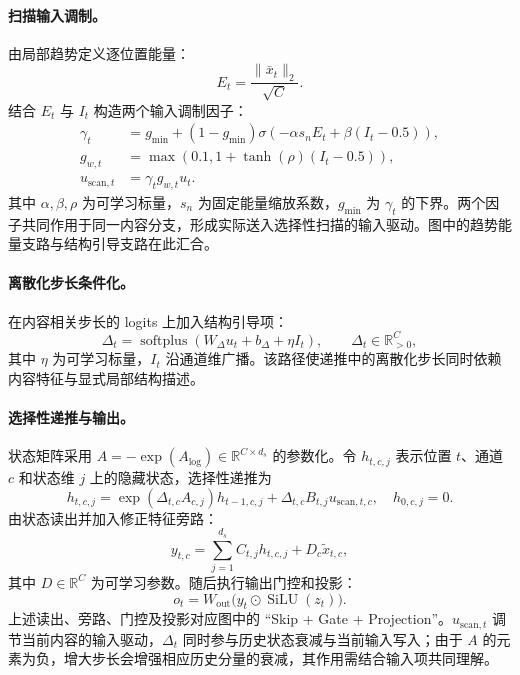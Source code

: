 \documentclass[UTF8,12pt,a4paper]{ctexart}
\begin{document}
\paragraph{扫描输入调制。}
由局部趋势定义逐位置能量：
\begin{equation}
E_t=\frac{\|\bar{x}_t\|_2}{\sqrt{C}}.
\label{eq:trend_energy}
\end{equation}
结合 $E_t$ 与 $I_t$ 构造两个输入调制因子：
\begin{align}
\gamma_t&=g_{\min}+(1-g_{\min})\sigma\!\left(-\alpha s_nE_t+\beta(I_t-0.5)\right),\\
g_{w,t}&=\max\!\left(0.1,1+\tanh(\rho)(I_t-0.5)\right),\\
u_{\mathrm{scan},t}&=\gamma_tg_{w,t}u_t.
\label{eq:modulation}
\end{align}
其中 $\alpha,\beta,\rho$ 为可学习标量，$s_n$ 为固定能量缩放系数，$g_{\min}$ 为 $\gamma_t$ 的下界。两个因子共同作用于同一内容分支，形成实际送入选择性扫描的输入驱动。图中的趋势能量支路与结构引导支路在此汇合。

\paragraph{离散化步长条件化。}
在内容相关步长的 logits 上加入结构引导项：
\begin{equation}
\Delta_t=\operatorname{softplus}\!\left(W_{\Delta}u_t+b_{\Delta}+\eta I_t\right),
\qquad\Delta_t\in\mathbb{R}_{>0}^{C},
\label{eq:delta_condition}
\end{equation}
其中 $\eta$ 为可学习标量，$I_t$ 沿通道维广播。该路径使递推中的离散化步长同时依赖内容特征与显式局部结构描述。

\paragraph{选择性递推与输出。}
状态矩阵采用 $A=-\exp(A_{\log})\in\mathbb{R}^{C\times d_s}$ 的参数化。令 $h_{t,c,j}$ 表示位置 $t$、通道 $c$ 和状态维 $j$ 上的隐藏状态，选择性递推为
\begin{equation}
h_{t,c,j}=\exp(\Delta_{t,c}A_{c,j})h_{t-1,c,j}+\Delta_{t,c}B_{t,j}u_{\mathrm{scan},t,c},
\quad h_{0,c,j}=0.
\label{eq:rgsp_state}
\end{equation}
由状态读出并加入修正特征旁路：
\begin{equation}
y_{t,c}=\sum_{j=1}^{d_s}C_{t,j}h_{t,c,j}+D_c\tilde{x}_{t,c},
\label{eq:ssm_readout}
\end{equation}
其中 $D\in\mathbb{R}^{C}$ 为可学习参数。随后执行输出门控和投影：
\begin{equation}
o_t=W_{\mathrm{out}}\bigl(y_t\odot\operatorname{SiLU}(z_t)\bigr).
\label{eq:rgsp_output}
\end{equation}
上述读出、旁路、门控及投影对应图中的 ``Skip + Gate + Projection''。$u_{\mathrm{scan},t}$ 调节当前内容的输入驱动，$\Delta_t$ 同时参与历史状态衰减与当前输入写入；由于 $A$ 的元素为负，增大步长会增强相应历史分量的衰减，其作用需结合输入项共同理解。
\end{document}

